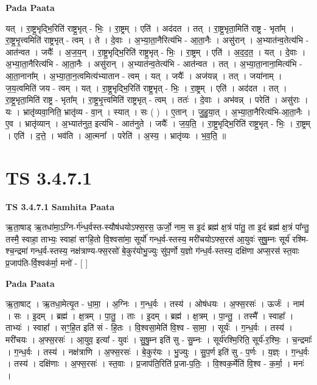 \documentclass[17pt]{extarticle}
\begin{document}
\textbf{Pada Paata} \newline

यत् । रा॒ष्ट्र॒भृद्भि॒रिति॑ राष्ट्र॒भृत् - भिः॒ । रा॒ष्ट्रम् । एति॑ । अद॑दत । तत् । रा॒ष्ट्र॒भृता॒मिति॑ राष्ट्र - भृता᳚म् । रा॒ष्ट्र॒भृ॒त्त्वमिति॑ राष्ट्रभृत् - त्वम् । ते । दे॒वाः । अ॒भ्या॒ता॒नैरित्य॑भि - आ॒ता॒नैः । असु॑रान् । अ॒भ्यात॑न्व॒तेत्य॑भि - आत॑न्वत । जयैः᳚ । अ॒ज॒य॒न् । रा॒ष्ट्र॒भृद्भि॒रिति॑ राष्ट्र॒भृत् - भिः॒ । रा॒ष्ट्रम् । एति॑ । अ॒द॒द॒त॒ । यत् । दे॒वाः । अ॒भ्या॒ता॒नैरित्य॑भि - आ॒ता॒नैः । असु॑रान् । अ॒भ्यात॑न्व॒तेत्य॑भि - आत॑न्वत । तत् । अ॒भ्या॒ता॒नाना॒मित्य॑भि - आ॒ता॒नाना᳚म् । अ॒भ्या॒ता॒न॒त्वमित्य॑भ्यातान - त्वम् । यत् । जयैः᳚ । अज॑यन्न् । तत् । जया॑नाम् । ज॒य॒त्वमिति॑ जय - त्वम् । यत् । रा॒ष्ट्र॒भृद्भि॒रिति॑ राष्ट्र॒भृत् - भिः॒ । रा॒ष्ट्रम् । एति॑ । अद॑दत । तत् । रा॒ष्ट्र॒भृता॒मिति॑ राष्ट्र - भृता᳚म् । रा॒ष्ट्र॒भृ॒त्त्वमिति॑ राष्ट्रभृत् - त्वम् । ततः॑ । दे॒वाः । अभ॑वन्न् । परेति॑ । असु॑राः । यः । भ्रातृ॑व्यवा॒निति॒ भ्रातृ॑व्य - वा॒न् । स्यात् । सः ( ) । ए॒तान् । जु॒हु॒या॒त् । अ॒भ्या॒ता॒नैरित्य॑भि-आ॒ता॒नैः । ए॒व । भ्रातृ॑व्यान् । अ॒भ्यात॑नुत॒ इत्य॑भि - आत॑नुते । जयैः᳚ । ज॒य॒ति॒ । रा॒ष्ट्र॒भृद्भि॒रिति॑ राष्ट्र॒भृत् - भिः॒ । रा॒ष्ट्रम् । एति॑ । द॒त्ते॒ । भव॑ति । आ॒त्मना᳚ । परेति॑ । अ॒स्य॒ । भ्रातृ॑व्यः । भ॒व॒ति॒ ॥  \newline




\section*{ TS 3.4.7.1 }

\textbf{TS 3.4.7.1 } \newline
\textbf{Samhita Paata} \newline

ऋ॒ता॒षाड् ऋ॒तधा॑मा॒ऽग्नि-र्ग॑न्ध॒र्वस्त-स्यौष॑धयोऽफ्स॒रस॒ ऊर्जो॒ नाम॒ स इ॒दं ब्रह्म॑ क्ष॒त्रं पा॑तु॒ ता इ॒दं ब्रह्म॑ क्ष॒त्रं पा᳚न्तु॒ तस्मै॒ स्वाहा॒ ताभ्यः॒ स्वाहा॑ सꣳहि॒तो वि॒श्वसा॑मा॒ सूर्यो॑ गन्ध॒र्व-स्तस्य॒ मरी॑चयोऽफ्स॒रस॑ आ॒युवः॑ सुषु॒म्नः सूर्य॑ रश्मि-श्च॒न्द्रमा॑ गन्ध॒र्व-स्तस्य॒ नक्ष॑त्राण्य-फ्स॒रसो॑ बे॒कुर॑योभु॒ज्युः सु॑प॒र्णो य॒ज्ञो ग॑न्ध॒र्व-स्तस्य॒ दक्षि॑णा अप्स॒रस॑ स्त॒वाः प्र॒जाप॑ति-र्वि॒श्वक॑र्मा॒ मनो॑ - [  ] \newline

\textbf{Pada Paata} \newline

ऋ॒ता॒षाट् । ऋ॒तधा॒मेत्यृ॒त - धा॒मा॒ । अ॒ग्निः । ग॒न्ध॒र्वः । तस्य॑ । ओष॑धयः । अ॒फ्स॒रसः॑ । ऊर्जः॑ । नाम॑ । सः । इ॒दम् । ब्रह्म॑ । क्ष॒त्रम् । पा॒तु॒ । ताः । इ॒दम् । ब्रह्म॑ । क्ष॒त्रम् । पा॒न्तु॒ । तस्मै᳚ । स्वाहा᳚ । ताभ्यः॑ । स्वाहा᳚ । सꣳ॒॒हि॒त इति॑ सं - हि॒तः । वि॒श्वसा॒मेति॑ वि॒श्व - सा॒मा॒ । सूर्यः॑ । ग॒न्ध॒र्वः । तस्य॑ । मरी॑चयः । अ॒फ्स॒रसः॑ । आ॒युव॒ इत्या᳚ - युवः॑ । सु॒षु॒म्न इति॑ सु - सु॒म्नः । सूर्य॑रश्मि॒रिति॒ सूर्य॑-र॒श्मिः॒ । च॒न्द्रमाः᳚ । ग॒न्ध॒र्वः । तस्य॑ । नक्ष॑त्राणि । अ॒फ्स॒रसः॑ । बे॒कुर॑यः । भु॒ज्युः । सु॒प॒र्ण इति॑ सु - प॒र्णः । य॒ज्ञ्ः । ग॒न्ध॒र्वः । तस्य॑ । दक्षि॑णाः । अ॒फ्स॒रसः॑ । स्त॒वाः । प्र॒जाप॑ति॒रिति॑ प्र॒जा-प॒तिः॒ । वि॒श्वक॒र्मेति॑ वि॒श्व - क॒र्मा॒ । मनः॑ ।  \newline
\end{document}
